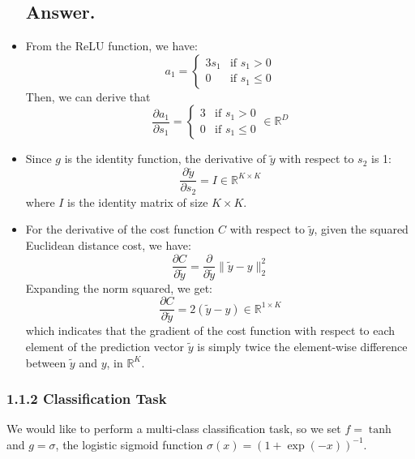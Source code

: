 \documentclass{article}
\begin{document}
\begin{itemize}
    \subsection*{Answer.}
    \item From the ReLU function, we have:
    \[a_1 = 
    \begin{cases}
    3s_1 & \text{if } s_{1} > 0 \\
    0 & \text{if } s_{1} \leq 0
    \end{cases}
    \]
    Then, we can derive that 
    \[ \frac{\partial a_1}{\partial s_1} = 
    \begin{cases}
    3 & \text{if } s_{1} > 0 \\
    0 & \text{if } s_{1} \leq 0
    \end{cases}
    \in \mathbb{R}^{D}
    \]
    
    \item Since \(g\) is the identity function, the derivative of \(\tilde{y}\) with respect to \(s_2\) is 1:
    \[ \frac{\partial \tilde{y}}{\partial s_2} = I \in \mathbb{R}^{K \times K} \]
    where \(I\) is the identity matrix of size \(K \times K\).
    
    \item For the derivative of the cost function \(C\) with respect to \(\tilde{y}\), given the squared Euclidean distance cost, we have:
    \[ \frac{\partial C}{\partial \tilde{y}} = \frac{\partial}{\partial \tilde{y}} \| \tilde{y} - y \|_2^2 \]
    Expanding the norm squared, we get:
    \[ \frac{\partial C}{\partial \tilde{y}} = 2 (\tilde{y} - y) \in \mathbb{R}^{1 \times K} \]
    which indicates that the gradient of the cost function with respect to each element of the prediction vector \(\tilde{y}\) is simply twice the element-wise difference between \(\tilde{y}\) and \(y\), in \(\mathbb{R}^K\).
    
\end{itemize}

\subsubsection*{1.1.2 Classification Task}

We would like to perform a multi-class classification task, so we set $f = \tanh$ and $g = \sigma$, the logistic sigmoid function $\sigma(x) = ({1 + \exp(-x)})^{-1}$.
\end{document}
